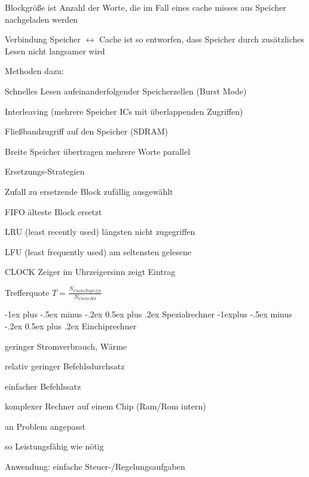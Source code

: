 \documentclass[10pt,landscape]{article}
\makeatletter
\renewcommand{\section}{\@startsection{section}{1}{0mm}%
                                {-1ex plus -.5ex minus -.2ex}%
                                {0.5ex plus .2ex}%
                                {\normalfont\large\bfseries}}
\renewcommand{\subsection}{\@startsection{subsection}{2}{0mm}%
                                {-1explus -.5ex minus -.2ex}%
                                {0.5ex plus .2ex}%
                                {\normalfont\normalsize\bfseries}}
\makeatother
\begin{document}
\begin{multicols}{3}
\begin{itemize*}
    \item Blockgröße ist Anzahl der Worte, die im Fall eines cache misses aus Speicher nachgeladen werden
    \item Verbindung Speicher $\leftrightarrow$ Cache ist so entworfen, dass Speicher durch zusätzliches Lesen nicht langsamer wird
    \item Methoden dazu:
    \begin{itemize*}
      \item Schnelles Lesen aufeinanderfolgender Speicherzellen (Burst Mode)
      \item Interleaving (mehrere Speicher ICs mit überlappenden Zugriffen)
      \item Fließbandzugriff auf den Speicher (SDRAM)
      \item Breite Speicher übertragen mehrere Worte parallel
    \end{itemize*}
    \item Ersetzungs-Strategien
    \begin{description*}
      \item[Zufall] zu ersetzende Block zufällig ausgewählt
      \item[FIFO] älteste Block ersetzt
      \item[LRU](least recently used) längsten nicht zugegriffen
      \item[LFU](least frequently used) am seltensten gelesene
      \item[CLOCK] Zeiger im Uhrzeigersinn zeigt Eintrag
    \end{description*}
    \item Trefferquote $T=\frac{N_{Cache Zugriffe}}{N_{Cache Hit}}$
  \end{itemize*}
  
  \section{Spezialrechner}
  \subsection{Einchiprechner}
  \begin{itemize*}
    \item geringer Stromverbrauch, Wärme
    \item relativ geringer Befehlsdurchsatz
    \item einfacher Befehlssatz
    \item komplexer Rechner auf einem Chip (Ram/Rom intern)
    \item an Problem angepasst
    \item so Leistungsfähig wie nötig
    \item Anwendung: einfache Steuer-/Regelungsaufgaben
  \end{itemize*}
  

\end{multicols}
\end{document}
